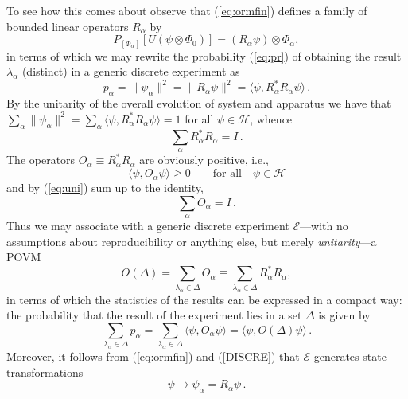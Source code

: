 \documentclass[12pt]{article}
\newcommand{\eq}[1]{(\ref{#1})}
\renewcommand{\dagger}{\ast}
\newcommand{\id}{I}
\renewcommand{\a}{\alpha}
\newcommand{\la}{\lambda_{\a}}
\newcommand{\suma}{\sum_{\a }}
\newcommand{\ot}{\otimes}
\newcommand{\psia}{\psi_{\a}}
\newcommand{\Phia}{\Phi_{\a}}
\renewcommand{\H}{\mbox{$\mathcal{H}$}}
\newcommand{\Aa}{R_{\a}}
\newcommand{\Aad}{R^{\dagger}_{\a}}
\newcommand{\E}{\mbox{$\mathscr{E}$}}
\begin{document}
To see how this comes about observe that \eq{eq:ormfin} defines a
family of bounded linear operators $\Aa$ by
%
\begin{equation}
P_{[\Phia]}\left[ U({\psi }\ot\Phi_0) \right] = (\Aa
\psi)\ot\Phia,
\label{DISCRE}
\end{equation}
%
in terms of which we may rewrite the probability \eq{eq:pr} of
obtaining the result $\la$ (distinct) in a generic discrete experiment
as
%
\begin{equation}
p_{\a} = \|\psia \|^2 = \|\Aa \psi \|^2= \langle
\psi, \Aad \Aa \psi\rangle\, .
\label{paA}
\end{equation}
%
By the unitarity of the overall evolution of system and apparatus we
have that $ \sum_{\a} \|\psia \|^2 = \sum_{\a}\langle \psi, \Aad \Aa
\psi\rangle = 1 $ for all $\psi\in \H$, whence
\begin{equation}
\suma   \Aad \Aa = \id \, .
\label{eq:uni}
\end{equation}
The operators $ O_\a \equiv \Aad \Aa $ are obviously positive, i.e.,
\begin{equation}
\langle \psi, O_{\a}\psi \rangle\ge 0\qquad\mbox{for all}\quad
\psi\in \H
\label{eq:posoper}
\end{equation}
%
and by (\ref{eq:uni}) sum up to the identity,
\begin{equation}
\sum_{\a} O_{\a}= \id  \, .
\label{eq:sumone}
\end{equation}
%
Thus we may associate with a generic discrete experiment \E---with no
assumptions about reproducibility or anything else, but merely
\emph{unitarity}---a POVM
%
\begin{equation}
O (\Delta) = \sum_{\la \in \Delta} O_\a \equiv \sum_{\la \in
\Delta} \Aad \Aa,
\label{oeslaa}
\end{equation}
%
in terms of which the statistics of the results can be expressed in a
compact way: the probability that the result of the experiment lies in
a set $\Delta$ is given by
\begin{equation}
\sum_{\la \in \Delta} p_{\a} =
\sum_{\la \in \Delta} \langle
\psi,O_\a \psi\rangle   =\langle
\psi, O(\Delta) \psi\rangle \, .
\label{pro}
\end{equation}
%
Moreover, it follows {}{}from \eq{eq:ormfin} and \eq{DISCRE} that \E{}
generates state transformations
\begin{equation}
    \psi \to \psia=\Aa \psi\,.
\label{gentr}
\end{equation}
\end{document}
